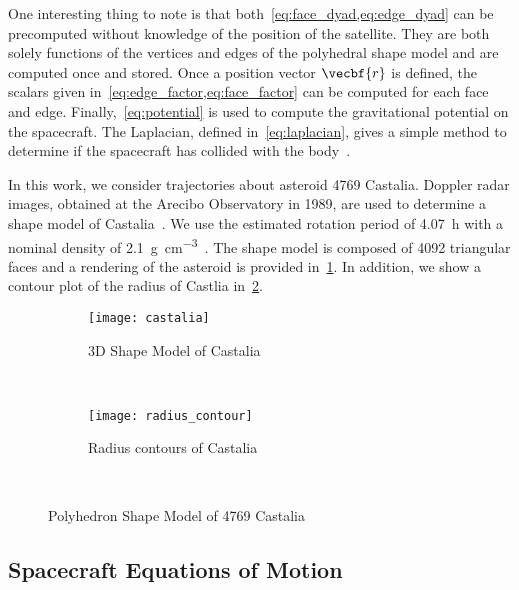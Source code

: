 One interesting thing to note is that both~\cref{eq:face_dyad,eq:edge_dyad} can be precomputed without knowledge of the position of the satellite.
They are both solely functions of the vertices and edges of the polyhedral shape model and are computed once and stored.
Once a position vector \( \vecbf{r} \) is defined, the scalars given in~\cref{eq:edge_factor,eq:face_factor} can be computed for each face and edge.
Finally,~\cref{eq:potential} is used to compute the gravitational potential on the spacecraft.
The Laplacian, defined in~\cref{eq:laplacian}, gives a simple method to determine if the spacecraft has collided with the body~\cite{werner1996}. 

In this work, we consider trajectories about asteroid 4769 Castalia.
Doppler radar images, obtained at the Arecibo Observatory in 1989, are used to determine a shape model of Castalia~\cite{hudson1994,neese2004}.
We use the estimated rotation period of \SI{4.07}{\hour} with a nominal density of \SI{2.1}{\gram\per\centi\meter\cubed}~\cite{scheeres1996}.
The shape model is composed of \num{4092} triangular faces and a rendering of the asteroid is provided in~\cref{fig:castalia_3d}.
In addition, we show a contour plot of the radius of Castlia in~\cref{fig:radius_contour}.
\begin{figure}
    \centering
    \begin{subfigure}[htbp]{0.45\textwidth}
        \texttt{[image: castalia]}
        \caption{3D Shape Model of Castalia} \label{fig:castalia_3d}
    \end{subfigure}~ %
    \begin{subfigure}[htbp]{0.45\textwidth}
        \texttt{[image: radius\_contour]}
        \caption{Radius contours of Castalia} \label{fig:radius_contour}
    \end{subfigure} ~ %
    \caption{Polyhedron Shape Model of 4769 Castalia}
    \label{fig:castalia}
\end{figure}

\subsection{Spacecraft Equations of Motion}\label{sec:sc_eoms}

